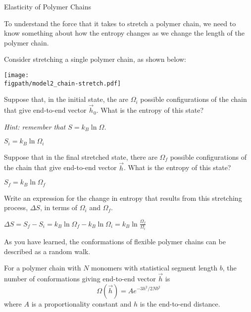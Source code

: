 \begin{activity}{Elasticity of Polymer Chains}
\begin{ctqs}
\end{ctqs}

\begin{model}
\label{\labelbase:mdl:chainstretch}
	To understand the force that it takes to stretch a polymer chain, we need to know something about how the entropy changes as we change the length of the polymer chain.
	
	Consider stretching a single polymer chain, as shown below:
	
	\vspace{6pt}
	\centerline{\texttt{[image: \\figpath/model2\_chain-stretch.pdf]}}
\end{model}

\begin{ctqs}
	\question Suppose that, in the initial state, the are $\Omega_i$ possible configurations of the chain that give end-to-end vector $\vec h_0$.  What is the entropy of this state?
	
		\emph{Hint: remember that $S = k_B\ln\Omega$.}
		
		\begin{solution}[0.25in]
			$S_i = k_B\ln\Omega_i$
		\end{solution}
	
	\question Suppose that in the final stretched state, there are $\Omega_f$ possible configurations of the chain that give end-to-end vector $\vec h$.  What is the entropy of this state?
		
		\begin{solution}[0.25in]
			$S_f = k_B\ln\Omega_f$
		\end{solution}
	
	\question Write an expression for the change in entropy that results from this stretching process, $\Delta S$, in terms of $\Omega_i$ and $\Omega_f$. \label{\labelbase:ctq:delS}
		
		\begin{solution}[0.75in]
			$\Delta S = S_f - S_i = k_B\ln\Omega_f - k_B\ln\Omega_i = k_B\ln\frac{\Omega_f}{\Omega_i}$
		\end{solution}
	
\end{ctqs}

\begin{infobox}

	As you have learned, the conformations of flexible polymer chains can be described as a random walk.
	
	For a polymer chain with $N$ monomers with statistical segment length $b$, the number of conformations giving end-to-end vector $\vec h$ is
	\begin{equation*}
		\Omega(\vec h) = A e^{-3h^2/2Nb^2}
	\end{equation*}
	where $A$ is a proportionality constant and $h$ is the end-to-end distance.
	

\end{infobox}
\end{activity}
